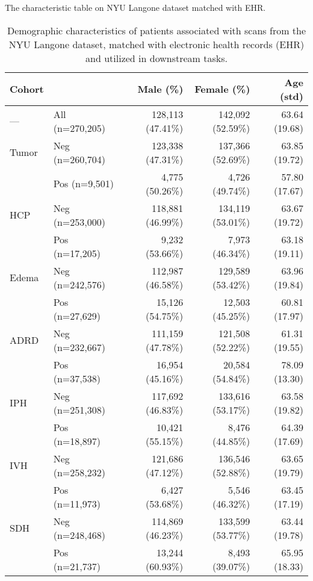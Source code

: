 \begin{table}[!htbp]
\centering
\caption{Demographic characteristics of patients associated with scans from the NYU Langone dataset, matched with electronic health records (EHR) and utilized in downstream tasks.}
\label{tab:characteristic}

 The characteristic table on NYU Langone dataset matched with EHR.
\begin{tabular}{ll|rr|r}
\toprule
                       \textbf{Cohort} &  &           \textbf{Male (\%)} &          \textbf{Female (\%)} &     \textbf{Age (std)} \\
\midrule
 --- & All (n=270,205) & 128,113 (47.41\%) & 142,092 (52.59\%) & 63.64 (19.68) \\
\midrule
       Tumor & Neg (n=260,704) & 123,338 (47.31\%) & 137,366 (52.69\%) & 63.85 (19.72) \\
             & Pos (n=9,501) &   4,775 (50.26\%) &   4,726 (49.74\%) & 57.80 (17.67) \\
\midrule
HCP & Neg (n=253,000) & 118,881 (46.99\%) & 134,119 (53.01\%) & 63.67 (19.72) \\
              & Pos (n=17,205) &   9,232 (53.66\%) &   7,973 (46.34\%) & 63.18 (19.11) \\
\midrule
Edema & Neg (n=242,576) & 112,987 (46.58\%) & 129,589 (53.42\%) & 63.96 (19.84) \\
      & Pos (n=27,629) &  15,126 (54.75\%) &  12,503 (45.25\%) & 60.81 (17.97) \\
\midrule
ADRD  & Neg (n=232,667) & 111,159 (47.78\%) & 121,508 (52.22\%) & 61.31 (19.55) \\
      & Pos (n=37,538) &  16,954 (45.16\%) &  20,584 (54.84\%) & 78.09 (13.30) \\
\midrule
          IPH & Neg (n=251,308) & 117,692 (46.83\%) & 133,616 (53.17\%) & 63.58 (19.82) \\
              & Pos (n=18,897) &  10,421 (55.15\%) &   8,476 (44.85\%) & 64.39 (17.69) \\
\midrule
          IVH & Neg (n=258,232) & 121,686 (47.12\%) & 136,546 (52.88\%) & 63.65 (19.79) \\
              & Pos (n=11,973) &   6,427 (53.68\%) &   5,546 (46.32\%) & 63.45 (17.19) \\
\midrule
          SDH & Neg (n=248,468) & 114,869 (46.23\%) & 133,599 (53.77\%) & 63.44 (19.78) \\
              & Pos (n=21,737) &  13,244 (60.93\%) &   8,493 (39.07\%) & 65.95 (18.33) \\

\end{tabular}
\end{table}
